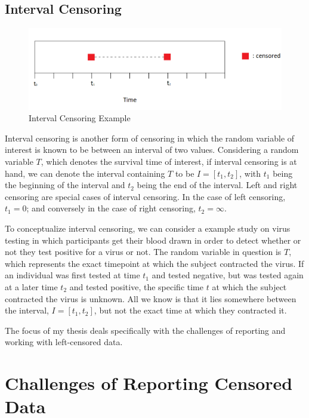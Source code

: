 \documentclass[12pt, twoside]{amherstthesis}
\begin{document}
\hypertarget{interval}{%
\subsection{Interval Censoring}\label{interval}}
\begin{figure}

{\centering \includegraphics[width=1\linewidth]{figures/interval_censoring_example_fix} 

}

\caption{Interval Censoring Example}\label{fig:intervalcensoringexample}
\end{figure}
Interval censoring is another form of censoring in which the random variable of interest is known to be between an interval of two values. Considering a random variable \(T\), which denotes the survival time of interest, if interval censoring is at hand, we can denote the interval containing \(T\) to be \(I = [t_1, t_2]\), with \(t_1\) being the beginning of the interval and \(t_2\) being the end of the interval. Left and right censoring are special cases of interval censoring. In the case of left censoring, \(t_1 = 0\); and conversely in the case of right censoring, \(t_2 = \infty\).

To conceptualize interval censoring, we can consider a example study on virus testing in which participants get their blood drawn in order to detect whether or not they test positive for a virus or not. The random variable in question is \(T\), which represents the exact timepoint at which the subject contracted the virus. If an individual was first tested at time \(t_1\) and tested negative, but was tested again at a later time \(t_2\) and tested positive, the specific time \(t\) at which the subject contracted the virus is unknown. All we know is that it lies somewhere between the interval, \(I = [t_1, t_2]\), but not the exact time at which they contracted it.

The focus of my thesis deals specifically with the challenges of reporting and working with left-censored data.

\hypertarget{challenges}{%
\section{Challenges of Reporting Censored Data}\label{challenges}}
\end{document}
